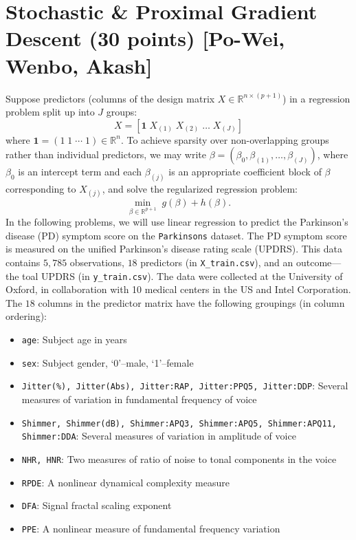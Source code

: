 \documentclass{article}
\theoremstyle{remark}
\theoremstyle{definition}
\def\R{\mathbb{R}}
\begin{document}
\section{Stochastic \& Proximal Gradient Descent (30 points) [Po-Wei, Wenbo, Akash]}
Suppose predictors (columns of the design matrix $X\in\R^{n \times (p+1)}$) in a
regression problem split up into $J$ groups:
\begin{equation}
X = \left[ \mathbf{1}\; X_{(1)} \; X_{(2)} \; \dots \;X_{(J)} \right]
\end{equation}
where $\mathbf{1} = (1\; 1 \; \cdots \;1) \in \mathbb{R}^n$. 
To achieve sparsity over non-overlapping groups rather than individual 
predictors, we may write $\beta = (\beta_0, \beta_{(1)}, \dots,
\beta_{(J)})$, where $\beta_0$ is an intercept term and each
$\beta_{(j)}$ is an appropriate coefficient block of $\beta$
corresponding to $X_{(j)}$, and solve the regularized regression problem:
\begin{equation}
\label{eq:group_lasso}
  \min_{\beta \in \mathbb{R}^{p+1}} \; 
        g(\beta) + h(\beta).
\end{equation}
In the following problems, we will use linear regression to predict the Parkinson’s disease (PD) symptom score on the \texttt{Parkinsons} dataset. The PD symptom score is measured on the unified Parkinson’s disease rating scale (UPDRS). 
This data contains $5,785$ observations, $18$ predictors (in \texttt{X\_train.csv}), and an outcome---the toal UPDRS (in \texttt{y\_train.csv}).
The data were collected at the University of Oxford, in collaboration with 10 medical centers in the US and Intel Corporation.
The $18$ columns in the predictor matrix have the following groupings (in column ordering):
\begin{itemize}
  \item \texttt{age}: Subject age in years
  \item \texttt{sex}: Subject gender, `0'--male, `1'--female
  \item \texttt{Jitter(\%), Jitter(Abs), Jitter:RAP, Jitter:PPQ5, Jitter:DDP}: Several measures of variation in fundamental frequency of voice
  \item \texttt{Shimmer, Shimmer(dB), Shimmer:APQ3, Shimmer:APQ5, Shimmer:APQ11, Shimmer:DDA}: Several measures of variation in amplitude of voice
  \item \texttt{NHR, HNR}: Two measures of ratio of noise to tonal components in the voice
  \item \texttt{RPDE}: A nonlinear dynamical complexity measure
  \item \texttt{DFA}: Signal fractal scaling exponent
  \item \texttt{PPE}: A nonlinear measure of fundamental frequency variation
\end{itemize}
\end{document}
